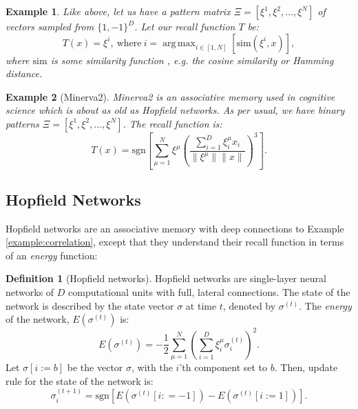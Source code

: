 \documentclass{article}
\DeclareMathOperator*{\argmax}{arg\,max}
\newtheorem{example}{Example}[subsection]
\theoremstyle{definition}
\newtheorem{definition}{Definition}[subsection]
\begin{document}
\begin{example}\label{example:argmax-am}
  Like above, let us have a pattern matrix $\Xi = [\xi^1, \xi^2,
  \dots, \xi^N]$ of
  vectors sampled from $\{1, -1\}^D$. Let our recall function $T$ be:
  \begin{equation}
    T(x) = \xi^i,~\text{where}~i = \argmax_{i \in [1, N]}
    [\text{sim}(\xi^i, x)],
  \end{equation}
  where $\text{sim}$ is some similarity function \parencite{kelly_memory_2017},
  e.g. the cosine similarity or Hamming distance.
\end{example}

\begin{example}[Minerva2]\label{example:minerva2}
  Minerva2 \parencite{hintzman_minerva_1984} is an associative memory
  used in cognitive
  science which is about as old as Hopfield networks. As per usual, we have
  binary patterns $\Xi = [\xi^1, \xi^2, \dots, \xi^N]$. The recall function is:
  \begin{equation}
    T(x) = \text{sgn} \left[ \sum^N_{\mu=1} \xi^\mu \left(
    \frac{\sum^D_{i=1} \xi^\mu_i x_i}{\|\xi^\mu\| \|x\|} \right)^3 \right].
  \end{equation}
\end{example}

\subsection{Hopfield Networks}\label{sec:hopfield-networks}

Hopfield networks
\parencites{hopfield_neural_1982,hopfield_neurons_1984} are an associative
memory with deep connections to Example \ref{example:correlation},
except that they
understand their recall function in terms of an \textit{energy} function:

\begin{definition}[Hopfield networks]\label{def:hopfield-nets}
  Hopfield networks are single-layer neural networks of $D$ computational units
  with full, lateral connections. The state of the network is described
  by the state vector $\sigma$ at time $t$, denoted by $\sigma^{(t)}$.
  The \textit{energy} of the network, $E (\sigma^{(t)})$ is:
  \begin{equation}
    E(\sigma^{(t)}) = - \frac{1}{2} \sum^N_{\mu=1} \left(\sum^D_{i=1}
    \xi^\mu_i \sigma^{(t)}_i\right)^2.
  \end{equation}
  Let $\sigma[i := b]$ be the vector $\sigma$, with the $i$'th
  component set to $b$. Then,
  update rule for the state of the network is:
  \begin{equation}
    \sigma^{(t+1)}_i = \text{sgn} \left[ E(\sigma^{(t)}[i : = -1]) -
    E(\sigma^{(t)}[i := 1]) \right].
  \end{equation}
\end{definition}
\end{document}
